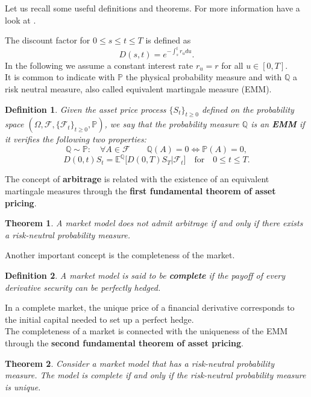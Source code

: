\documentclass[a4paper,10pt]{article}
\newcommand{\numberset}{\mathbb}
\newcommand{\E}{\numberset{E}}
\newcommand{\PP}{\numberset{P}}
\newcommand{\Q}{\numberset{Q}}
\newcommand{\F}{\mathcal{F}}
\newtheorem{Theorem}{Theorem}[section]
\newtheorem{Definition}{Definition}[section]
\begin{document}
Let us recall some useful definitions and theorems. For more information have a look at \cite{Cont}.

The discount factor for $0 \leq s \leq t \leq T$ is defined as
\begin{equation}\label{discount_factor}
 D(s,t) = e^{-\int_s^t r_u du}.
\end{equation}
In the following we assume a constant interest rate $r_u = r$ for all $u \in [0,T]$. \\
It is common to indicate with $\PP$ the physical probability measure and with $\Q$ a risk neutral measure, also called equivalent martingale measure (EMM).
\begin{Definition}
 Given the asset price process $\{S_t\}_{t\geq0}$ defined on the probability space 
 $(\Omega,\mathcal{F},\{\mathcal{F}_{t}\}_{t\geq0},\PP)$, we say that the probability measure $\Q$ is an \textbf{EMM}
 if it verifies the following two properties:
 \begin{equation}
 \Q \sim \PP : \quad \forall A \in \mathcal{F} \quad \quad \Q(A) = 0 \Leftrightarrow \PP(A) = 0,  
 \end{equation}
\begin{equation}
 D(0,t) S_t = \E^{\Q} \bigl[ D(0,T) S_T \big| \F_t \bigr] \quad \mbox{for} \quad 0\leq t \leq T.
\end{equation}
\end{Definition}

The concept of \textbf{arbitrage} is related with the existence of an equivalent martingale measures through the \textbf{first fundamental theorem of asset pricing}.
\begin{Theorem}
 A market model does not admit arbitrage if and only if there exists a risk-neutral probability measure. 
\end{Theorem}
Another important concept is the completeness of the market.
\begin{Definition}
 A market model is said to be \textbf{complete} if the payoff of every derivative security can be perfectly hedged. 
\end{Definition}
In a complete market, the unique price of a financial derivative corresponds to the initial capital needed to set up a perfect hedge.\\
The completeness of a market is connected with the uniqueness of the EMM through the
\textbf{second fundamental theorem of asset pricing}.
\begin{Theorem}
 Consider a market model that has a risk-neutral probability measure. The model is complete if and only if the risk-neutral probability measure is unique.
\end{Theorem}
\end{document}

